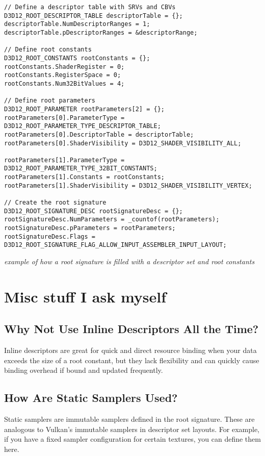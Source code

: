 \documentclass{article}
\begin{document}
\begin{verbatim}
// Define a descriptor table with SRVs and CBVs
D3D12_ROOT_DESCRIPTOR_TABLE descriptorTable = {};
descriptorTable.NumDescriptorRanges = 1;
descriptorTable.pDescriptorRanges = &descriptorRange;

// Define root constants
D3D12_ROOT_CONSTANTS rootConstants = {};
rootConstants.ShaderRegister = 0;
rootConstants.RegisterSpace = 0;
rootConstants.Num32BitValues = 4;

// Define root parameters
D3D12_ROOT_PARAMETER rootParameters[2] = {};
rootParameters[0].ParameterType = D3D12_ROOT_PARAMETER_TYPE_DESCRIPTOR_TABLE;
rootParameters[0].DescriptorTable = descriptorTable;
rootParameters[0].ShaderVisibility = D3D12_SHADER_VISIBILITY_ALL;

rootParameters[1].ParameterType = D3D12_ROOT_PARAMETER_TYPE_32BIT_CONSTANTS;
rootParameters[1].Constants = rootConstants;
rootParameters[1].ShaderVisibility = D3D12_SHADER_VISIBILITY_VERTEX;

// Create the root signature
D3D12_ROOT_SIGNATURE_DESC rootSignatureDesc = {};
rootSignatureDesc.NumParameters = _countof(rootParameters);
rootSignatureDesc.pParameters = rootParameters;
rootSignatureDesc.Flags = D3D12_ROOT_SIGNATURE_FLAG_ALLOW_INPUT_ASSEMBLER_INPUT_LAYOUT;
\end{verbatim}

\textit{example of how a root signature is filled with a descriptor set and root constants}

\section*{Misc stuff I ask myself}

\subsection*{Why Not Use Inline Descriptors All the Time?}
Inline descriptors are great for quick and direct resource binding when your data exceeds the size of a root constant, but they lack flexibility and can quickly cause binding overhead if bound and updated frequently.

\subsection*{How Are Static Samplers Used?}
Static samplers are immutable samplers defined in the root signature. These are analogous to Vulkan's immutable samplers in descriptor set layouts. For example, if you have a fixed sampler configuration for certain textures, you can define them here.
\end{document}
